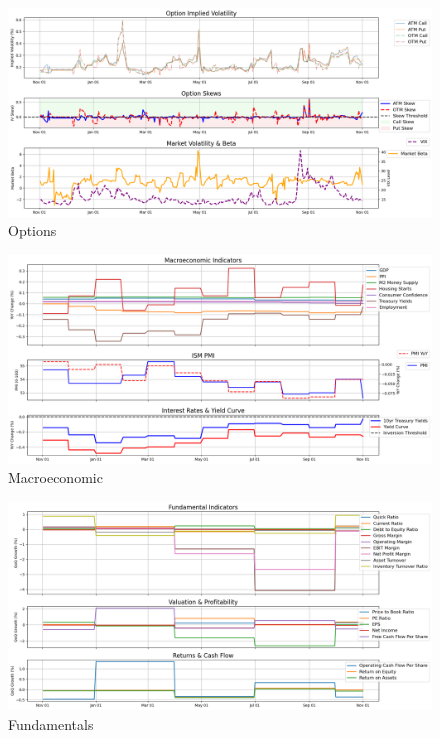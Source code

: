 \documentclass[8pt]{scrartcl}
\begin{document}
\begin{figure}[H]
    \centering
    \includegraphics[width=1\linewidth]{judge_reviews/MSFT_M_gpt-4o-mini/2015-11-02/judge_Option_Implied_Volatility.png}
    \caption{Options}
\end{figure}

\begin{figure}[H]
    \centering
    \includegraphics[width=1\linewidth]{judge_reviews/MSFT_M_gpt-4o-mini/2015-11-02/judge_Macroeconomic_Indicators.png}
    \caption{Macroeconomic}
\end{figure}

\begin{figure}[H]
    \centering
    \includegraphics[width=1\linewidth]{judge_reviews/MSFT_M_gpt-4o-mini/2015-11-02/judge_Fundamental_Indicators.png}
    \caption{Fundamentals}
\end{figure}
\end{document}
